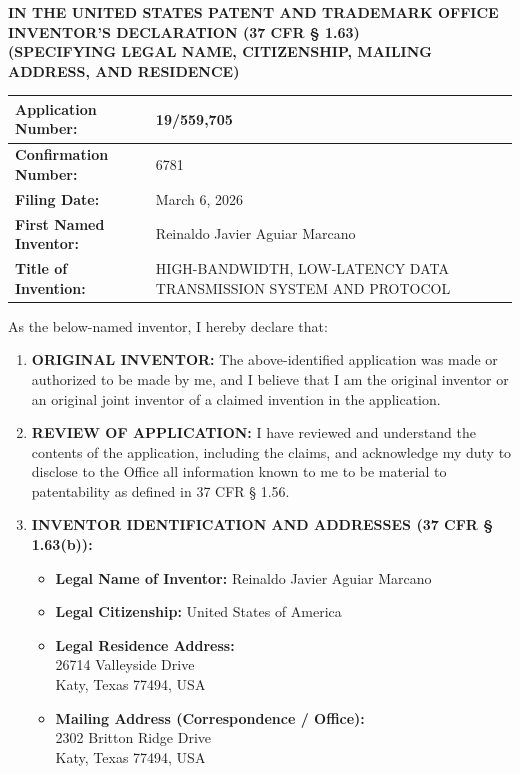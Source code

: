 \documentclass[11pt,letterpaper]{article}
\begin{document}
\thispagestyle{empty}

\begin{center}
    \large\textbf{IN THE UNITED STATES PATENT AND TRADEMARK OFFICE} \\
    \vspace{0.2cm}
    \textbf{\large INVENTOR'S DECLARATION (37 CFR \S{} 1.63)} \\
    \textbf{(SPECIFYING LEGAL NAME, CITIZENSHIP, MAILING ADDRESS, AND RESIDENCE)}
\end{center}

\vspace{0.3cm}
\noindent\begin{tabular}{|p{2.5in}|p{3.8in}|}
\hline
\textbf{Application Number:} & 19/559,705 \\
\hline
\textbf{Confirmation Number:} & 6781 \\
\hline
\textbf{Filing Date:} & March 6, 2026 \\
\hline
\textbf{First Named Inventor:} & Reinaldo Javier Aguiar Marcano \\
\hline
\textbf{Title of Invention:} & HIGH-BANDWIDTH, LOW-LATENCY DATA TRANSMISSION SYSTEM AND PROTOCOL \\
\hline
\end{tabular}

\vspace{0.5cm}

As the below-named inventor, I hereby declare that:

\begin{enumerate}[leftmargin=2em, itemsep=6pt]
    \item \textbf{ORIGINAL INVENTOR:} The above-identified application was made or authorized to be made by me, and I believe that I am the original inventor or an original joint inventor of a claimed invention in the application.
    
    \item \textbf{REVIEW OF APPLICATION:} I have reviewed and understand the contents of the application, including the claims, and acknowledge my duty to disclose to the Office all information known to me to be material to patentability as defined in 37 CFR \S{} 1.56.
    
    \item \textbf{INVENTOR IDENTIFICATION AND ADDRESSES (37 CFR \S{} 1.63(b)):}
    \begin{itemize}[leftmargin=1.5em, itemsep=3pt]
        \item \textbf{Legal Name of Inventor:} Reinaldo Javier Aguiar Marcano
        \item \textbf{Legal Citizenship:} United States of America
        \item \textbf{Legal Residence Address:} \\
              26714 Valleyside Drive \\
              Katy, Texas 77494, USA
        \item \textbf{Mailing Address (Correspondence / Office):} \\
              2302 Britton Ridge Drive \\
              Katy, Texas 77494, USA
    \end{itemize}
\end{enumerate}
\end{document}
